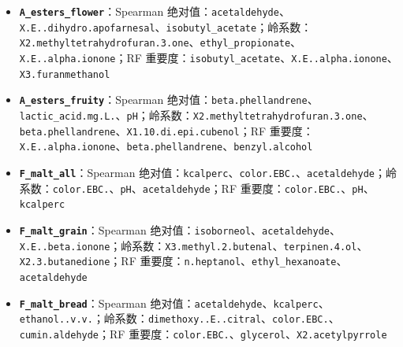 \documentclass[
  11pt,
]{ctexart}
\newcounter{none} %
\begin{document}
\begin{itemize}
  重要度：\texttt{n.hexanol}、\texttt{benzaldehyde}、\texttt{esters\_sum}
\item
  \textbf{\texttt{A\_\allowbreak{}esters\_\allowbreak{}flower}}：Spearman
  绝对值：\texttt{acetaldehyde}、\texttt{X.\allowbreak{}E.\allowbreak{}.\allowbreak{}dihydro.\allowbreak{}apofarnesal}、\texttt{isobutyl\_\allowbreak{}acetate}；岭系数：\texttt{X2.\allowbreak{}methyltetrahydrofuran.\allowbreak{}3.\allowbreak{}one}、\texttt{ethyl\_\allowbreak{}propionate}、\texttt{X.\allowbreak{}E.\allowbreak{}.\allowbreak{}alpha.\allowbreak{}ionone}；RF
  重要度：\texttt{isobutyl\_\allowbreak{}acetate}、\texttt{X.\allowbreak{}E.\allowbreak{}.\allowbreak{}alpha.\allowbreak{}ionone}、\texttt{X3.\allowbreak{}furanmethanol}
\item
  \textbf{\texttt{A\_\allowbreak{}esters\_\allowbreak{}fruity}}：Spearman
  绝对值：\texttt{beta.\allowbreak{}phellandrene}、\texttt{lactic\_\allowbreak{}acid.\allowbreak{}mg.\allowbreak{}L.\allowbreak{}}、\texttt{pH}；岭系数：\texttt{X2.\allowbreak{}methyltetrahydrofuran.\allowbreak{}3.\allowbreak{}one}、\texttt{beta.\allowbreak{}phellandrene}、\texttt{X1.\allowbreak{}10.\allowbreak{}di.\allowbreak{}epi.\allowbreak{}cubenol}；RF
  重要度：\texttt{X.\allowbreak{}E.\allowbreak{}.\allowbreak{}alpha.\allowbreak{}ionone}、\texttt{beta.\allowbreak{}phellandrene}、\texttt{benzyl.\allowbreak{}alcohol}
\item
  \textbf{\texttt{F\_malt\_all}}：Spearman
  绝对值：\texttt{kcalperc}、\texttt{color.EBC.}、\texttt{acetaldehyde}；岭系数：\texttt{color.EBC.}、\texttt{pH}、\texttt{acetaldehyde}；RF
  重要度：\texttt{color.EBC.}、\texttt{pH}、\texttt{kcalperc}
\item
  \textbf{\texttt{F\_\allowbreak{}malt\_\allowbreak{}grain}}：Spearman
  绝对值：\texttt{isoborneol}、\texttt{acetaldehyde}、\texttt{X.\allowbreak{}E.\allowbreak{}.\allowbreak{}beta.\allowbreak{}ionone}；岭系数：\texttt{X3.\allowbreak{}methyl.\allowbreak{}2.\allowbreak{}butenal}、\texttt{terpinen.4.ol}、\texttt{X2.\allowbreak{}3.\allowbreak{}butanedione}；RF
  重要度：\texttt{n.heptanol}、\texttt{ethyl\_\allowbreak{}hexanoate}、\texttt{acetaldehyde}
\item
  \textbf{\texttt{F\_\allowbreak{}malt\_\allowbreak{}bread}}：Spearman
  绝对值：\texttt{acetaldehyde}、\texttt{kcalperc}、\texttt{ethanol..v.v.}；岭系数：\texttt{dimethoxy.\allowbreak{}.\allowbreak{}E.\allowbreak{}.\allowbreak{}citral}、\texttt{color.EBC.}、\texttt{cumin.\allowbreak{}aldehyde}；RF
  重要度：\texttt{color.EBC.}、\texttt{glycerol}、\texttt{X2.\allowbreak{}acetylpyrrole}

\end{itemize}
\end{document}
